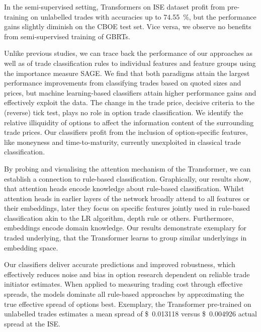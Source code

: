 In the semi-supervised setting, Transformers on \gls{ISE} dataset profit from pre-training on unlabelled trades with accuracies up to \SI{74.55}{\percent}, but the performance gains slightly diminish on the \gls{CBOE} test set. Vice versa, we observe no benefits from semi-supervised training of \glspl{GBRT}.

Unlike previous studies, we can trace back the performance of our approaches as well as of trade classification rules to individual features and feature groups using the importance measure \gls{SAGE}. We find that both paradigms attain the largest performance improvements from classifying trades based on quoted sizes and prices, but machine learning-based classifiers attain higher performance gains and effectively exploit the data. The change in the trade price, decisive criteria to the (reverse) tick test, plays no role in option trade classification. We identify the relative illiquidity of options to affect the information content of the surrounding trade prices. Our classifiers profit from the inclusion of option-specific features, like moneyness and time-to-maturity, currently unexploited in classical trade classification.

By probing and visualising the attention mechanism of the Transformer, we can establish a connection to rule-based classification. Graphically, our results show, that attention heads encode knowledge about rule-based classification. Whilst attention heads in earlier layers of the network broadly attend to all features or their embeddings, later they focus on specific features jointly used in rule-based classification akin to the \gls{LR} algorithm, depth rule or others. Furthermore, embeddings encode domain knowledge. Our results demonstrate exemplary for traded underlying, that the Transformer learns to group similar underlyings in embedding space.

Our classifiers deliver accurate predictions and improved robustness, which effectively reduces noise and bias in option research dependent on reliable trade initiator estimates. When applied to measuring trading cost through effective spreads, the models dominate all rule-based approaches by approximating the true effective spread of options best. Exemplary, the Transformer pre-trained on unlabelled trades estimates a mean spread of  \SI[round-mode=places, round-precision=3]{0.013118}[\$]{} versus \SI[round-mode=places, round-precision=3]{0.004926}[\$]{} actual spread at the \gls{ISE}.


